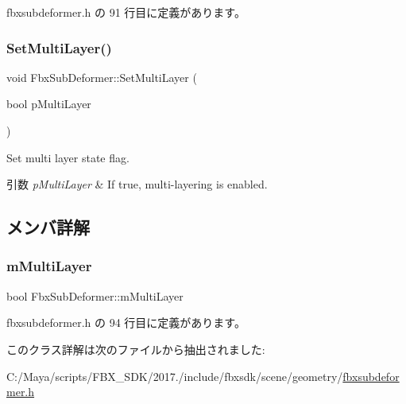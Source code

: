  fbxsubdeformer.\+h の 91 行目に定義があります。

\mbox{\label{class_fbx_sub_deformer_a46748fbb4e8496449bb28e6eeefde288}} 
\subsubsection{\texorpdfstring{Set\+Multi\+Layer()}{SetMultiLayer()}}
{\footnotesize\ttfamily void Fbx\+Sub\+Deformer\+::\+Set\+Multi\+Layer (\begin{DoxyParamCaption}\item[{bool}]{p\+Multi\+Layer }\end{DoxyParamCaption})}

Set multi layer state flag. 
\begin{DoxyParams}{引数}
{\em p\+Multi\+Layer} & If {\ttfamily true}, multi-\/layering is enabled. \\
\hline
\end{DoxyParams}


\subsection{メンバ詳解}
\mbox{\label{class_fbx_sub_deformer_aedda8831e40648602b073c9613687e9d}} 
\subsubsection{\texorpdfstring{m\+Multi\+Layer}{mMultiLayer}}
{\footnotesize\ttfamily bool Fbx\+Sub\+Deformer\+::m\+Multi\+Layer\hspace{0.3cm}{\ttfamily [protected]}}



 fbxsubdeformer.\+h の 94 行目に定義があります。



このクラス詳解は次のファイルから抽出されました\+:\begin{DoxyCompactItemize}
\item 
C\+:/\+Maya/scripts/\+F\+B\+X\+\_\+\+S\+D\+K/2017./include/fbxsdk/scene/geometry/\hyperlink{fbxsubdeformer_8h}{fbxsubdeformer.\+h}\end{DoxyCompactItemize}
